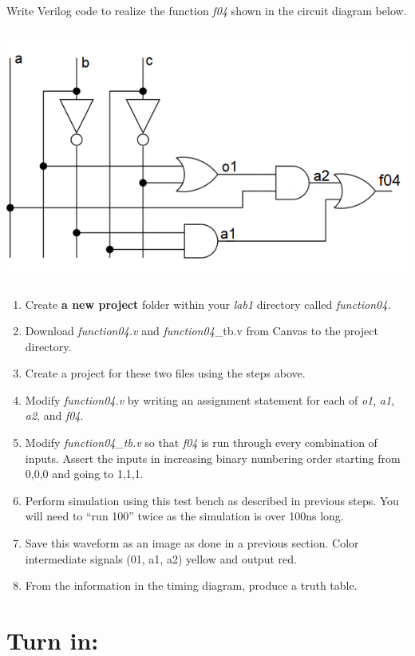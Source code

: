 \documentclass[
]{article}
\begin{document}
Write Verilog code to realize the function \emph{f04} shown in the
circuit diagram below.

\includegraphics[width=5.61339in,height=3.28472in]{vertopal_3cb071cd52e44dfb8dc5befe7ee47074/media/image6.png}

\begin{enumerate}
\def\labelenumi{\arabic{enumi}.}
\item
  Create \textbf{a new project} folder within your \emph{lab1} directory
  called \emph{function04.}
\item
  Download \emph{function04.v} and \emph{function04}\_tb.v from Canvas
  to the project directory.
\item
  Create a project for these two files using the steps above.
\item
  Modify \emph{function04.v} by writing an assignment statement for each
  of \emph{o1}, \emph{a1}, \emph{a2}, and \emph{f04}.
\item
  Modify \emph{function04\_tb.v} so that \emph{f04} is run through every
  combination of inputs. Assert the inputs in increasing binary
  numbering order starting from 0,0,0 and going to 1,1,1.
\item
  Perform simulation using this test bench as described in previous
  steps. You will need to ``run 100'' twice as the simulation is over
  100ns long.
\item
  Save this waveform as an image as done in a previous section. Color
  intermediate signals (01, a1, a2) yellow and output red.
\item
  From the information in the timing diagram, produce a truth table.
\end{enumerate}

\hypertarget{turn-in}{%
\section{Turn in:}\label{turn-in}}
\end{document}
